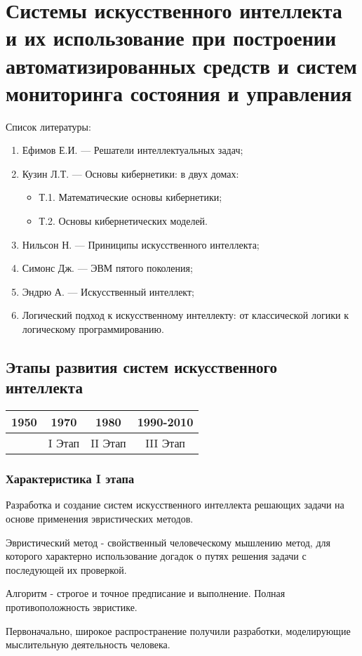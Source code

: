 \documentclass[a4paper,12pt]{report}
\begin{document}
\chapter{Системы искусственного интеллекта и их использование при построении
	автоматизированных средств и систем мониторинга состояния и управления}

Список литературы:

\begin{enumerate}
	\item Ефимов Е.И. — Решатели интеллектуальных задач;
	\item Кузин Л.Т. — Основы кибернетики: в двух домах:
		\begin{itemize}
			\item Т.1. Математические основы кибернетики;
			\item Т.2. Основы кибернетических моделей.
		\end{itemize}
	\item Нильсон Н. — Приниципы искусственного интеллекта;
	\item Симонс Дж. — ЭВМ пятого поколения;
	\item Эндрю А. — Искусственный интеллект;
	\item Логический подход к искусственному интеллекту: от классической логики
		к логическому программированию.
\end{enumerate}


\section{Этапы развития систем искусственного интеллекта}

\begin{tabular}{ c | c | c | c }
	1950 & 1970 & 1980 & 1990-2010 \\
	\hline
	& I Этап & II Этап & III Этап
\end{tabular}


\subsection{Характеристика I этапа}
	Разработка и создание систем искусственного интеллекта
	решающих задачи на основе применения эвристических методов. \par
	Эвристический метод - свойственный человеческому мышлению метод, для которого
	характерно использование догадок о путях решения задачи с последующей их
	проверкой. \par
	Алгоритм - строгое и точное предписание и выполнение. Полная
	противоположность эвристике. \par
	Первоначально, широкое распространение получили разработки,
	моделирующие мыслительную деятельность человека.\par
\end{document}
